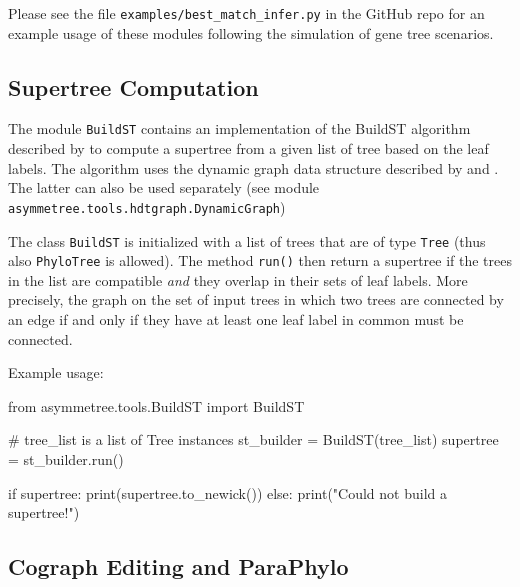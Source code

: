 \documentclass[hidelinks,11pt]{scrreprt}
\begin{document}
Please see the file \texttt{examples/best\_match\_infer.py} in the GitHub repo for an example usage of these modules following the simulation of gene tree scenarios.



\subsection{Supertree Computation}

The module \texttt{BuildST} contains an implementation of the BuildST algorithm described by \citet{deng2016} to compute a supertree from a given list of tree based on the leaf labels.
The algorithm uses the dynamic graph data structure described by \citet{henzinger1995} and \citet{holm2001}.
The latter can also be used separately (see module \texttt{asymmetree.tools.hdtgraph.DynamicGraph})

The class \texttt{BuildST} is initialized with a list of trees that are of type \texttt{Tree} (thus also \texttt{PhyloTree} is allowed).
The method \texttt{run()} then return a supertree if the trees in the list are compatible \emph{and} they overlap in their sets of leaf labels.
More precisely, the graph on the set of input trees in which two trees are connected by an edge if and only if they have at least one leaf label in common must be connected.

Example usage:

\vspace{2mm}
\begin{python}
from asymmetree.tools.BuildST import BuildST

# tree_list is a list of Tree instances
st_builder = BuildST(tree_list)
supertree = st_builder.run()

if supertree:
	print(supertree.to_newick())
else:
	print("Could not build a supertree!")
\end{python}
\vspace{2mm}


\subsection{Cograph Editing and ParaPhylo}
\end{document}
